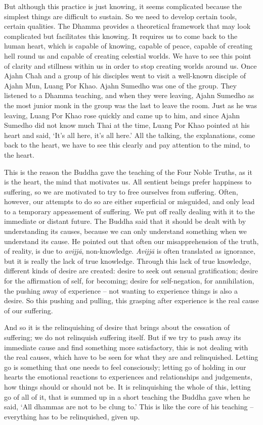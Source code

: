 But although this practice is just knowing, it seems complicated because
the simplest things are difficult to sustain. So we need to develop
certain tools, certain qualities. The Dhamma provides a theoretical
framework that may look complicated but facilitates this knowing. It
requires us to come back to the human heart, which is capable of
knowing, capable of peace, capable of creating hell round us and capable
of creating celestial worlds. We have to see this point of clarity and
stillness within us in order to stop creating worlds around us. Once
Ajahn Chah and a group of his disciples went to visit a well-known
disciple of Ajahn Mun, Luang Por Khao. Ajahn Sumedho was one of the
group. They listened to a Dhamma teaching, and when they were leaving, 
Ajahn Sumedho as the most junior monk in the group was the last to leave
the room. Just as he was leaving, Luang Por Khao rose quickly and came up
to him, and since Ajahn Sumedho did not know much Thai at the time, 
Luang Por Khao pointed at his heart and said, `It's all here, it's all
here.' All the talking, the explanations, come back to the heart, we
have to see this clearly and pay attention to the mind, to the heart. 

This is the reason the Buddha gave the teaching of the Four Noble
Truths, as it is the heart, the mind that motivates us. All sentient
beings prefer happiness to suffering, so we are motivated to try to free
ourselves from suffering. Often, however, our attempts to do so are
either superficial or misguided, and only lead to a temporary
appeasement of suffering. We put off really dealing with it to the
immediate or distant future. The Buddha said that it should be dealt
with by understanding its causes, because we can only understand
something when we understand its cause. He pointed out that often our
misapprehension of the truth, of reality, is due to \emph{avijjā}, 
non-knowledge. \emph{Avijjā} is often translated as ignorance, but it is
really the lack of true knowledge. Through this lack of true knowledge, 
different kinds of desire are created: desire to seek out sensual
gratification; desire for the affirmation of self, for becoming; desire
for self-negation, for annihilation, the pushing away of experience --
not wanting to experience things is also a desire. So this pushing and
pulling, this grasping after experience is the real cause of our
suffering. 

And so it is the relinquishing of desire that brings about the cessation
of suffering; we do not relinquish suffering itself. But if we try to
push away its immediate cause and find something more satisfactory, this
is not dealing with the real causes, which have to be seen for what they
are and relinquished. Letting go is something that one needs to feel
consciously; letting go of holding in our hearts the emotional reactions
to experiences and relationships and judgements, how things should or
should not be. It is relinquishing the whole of this, letting go of all
of it, that is summed up in a short teaching the Buddha gave when he
said, `All dhammas are not to be clung to.' This is like the core of his
teaching -- everything has to be relinquished, given up. 

